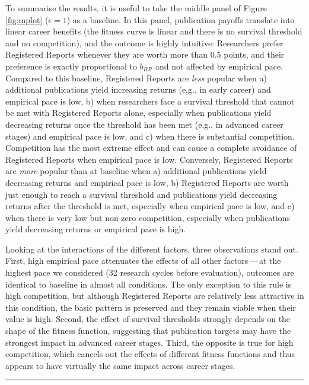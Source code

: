 \documentclass[
  ,man,mask,floatsintext]{apa6}
\begin{document}
To summarise the results, it is useful to take
the middle panel of Figure \ref{fig:mplot} (\(\epsilon = 1\)) as a baseline.
In this panel, publication payoffs translate into linear career benefits (the fitness curve is linear and there is no survival threshold and no competition), and the outcome is highly intuitive:
Researchers prefer Registered Reports whenever they are worth more than 0.5 points, and their preference is exactly proportional to \(b_{RR}\) and not affected by empirical pace.
Compared to this baseline, Registered Reports are \emph{less} popular when a) additional publications yield increasing returns (e.g., in early career) and empirical pace is low, b) when researchers face a survival threshold that cannot be met with Registered Reports alone, especially when publications yield decreasing returns once the threshold has been met (e.g., in advanced career stages) and empirical pace is low, and c) when there is substantial competition.
Competition has the most extreme effect and can cause a complete avoidance of Registered Reports when empirical pace is low.
Conversely, Registered Reports are \emph{more} popular than at baseline when a) additional publications yield decreasing returns and empirical pace is low, b) Registered Reports are worth just enough to reach a survival threshold and publications yield decreasing returns after the threshold is met, especially when empirical pace is low, and c) when there is very low but non-zero competition, especially when publications yield decreasing returns or empirical pace is high.

Looking at the interactions of the different factors, three observations stand out.
First, high empirical pace attenuates the effects of all other factors\(\,\)---\(\,\)at the highest pace we considered (32 research cycles before evaluation), outcomes are identical to baseline in almost all conditions.
The only exception to this rule is high competition, but although Registered Reports are relatively less attractive in this condition, the basic pattern is preserved and they remain viable when their value is high.
Second, the effect of survival thresholds strongly depends on the shape of the fitness function, suggesting that publication targets may have the strongest impact in advanced career stages.
Third, the opposite is true for high competition, which cancels out the effects of different fitness functions and thus appears to have virtually the same impact across career stages.

\begin{center}\rule{0.5\linewidth}{0.5pt}\end{center}
\end{document}
